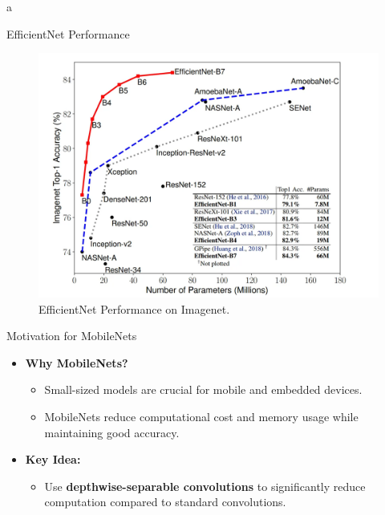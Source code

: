 a\documentclass[10pt]{beamer}
\theoremstyle{remark}
\theoremstyle{definition}
\begin{document}
\begin{frame}{EfficientNet Performance}
\begin{figure}
\centering
\includegraphics[width=\textwidth,height=.7\textheight,keepaspectratio]{./images/ENet_2.png}
\caption{EfficientNet Performance on Imagenet.}
\end{figure}
\end{frame}


\begin{frame}{Motivation for MobileNets}
\begin{itemize}
    \item \textbf{Why MobileNets?}
    \begin{itemize}
        \item Small-sized models are crucial for mobile and embedded devices.
        \item MobileNets reduce computational cost and memory usage while maintaining good accuracy.
    \end{itemize}
    \item \textbf{Key Idea:}
    \begin{itemize}
        \item Use \textbf{depthwise-separable convolutions} to significantly reduce computation compared to standard convolutions.
    \end{itemize}
\end{itemize}
\end{frame}
\end{document}
